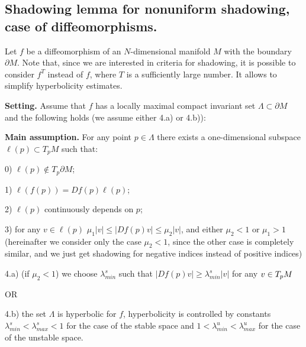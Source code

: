 \documentclass[11pt]{article}
\theoremstyle{Mystyle}
\begin{document}
\subsection{Shadowing lemma for nonuniform shadowing, case of diffeomorphisms.}

Let $f$ be a diffeomorphism of an $N$-dimensional manifold $M$ with the boundary~$\partial M$.
Note that, since we are interested in criteria for shadowing, it is possible to consider $f^{T}$ instead of $f$, where $T$ is a sufficiently large number. It allows to simplify hyperbolicity estimates.

\textbf{Setting.}  %
Assume that $f$ has a locally maximal compact invariant set $\Lambda\subset\partial M$ and the following holds (we assume either 4.a) or 4.b)):

\textbf{Main assumption.} For any point $p\in\Lambda$ there exists a one-dimensional subspace $\ell(p)\subset T_pM$ such that: 

0) $\ell(p)\notin T_{p}\partial M$;

1) $\ell(f(p)) = Df(p)\ell(p)$; 

2) $\ell(p)$ continuously depends on $p$; 

3) for any $v\in\ell(p)$ $\mu_1|v|\leq |Df(p)v|\leq\mu_2|v|$, and either $\mu_2<1$ or $\mu_1>1$ (hereinafter we consider only the case $\mu_2<1$, since the other case is completely similar, and we just get shadowing for negative indices instead of positive indices)

4.a) (if $\mu_2<1$) we choose $\lambda^s_{min}$ such that 
$|Df(p)v|\geq \lambda^{s}_{min}|v|$ for any $v\in\nobreak T_{p}M$

OR

4.b) the set $\Lambda$ is hyperbolic for $f$, hyperbolicity is controlled by constants
$\lambda^s_{min}<\lambda^s_{max}<1$ for the case of the stable space and $1<\lambda^u_{min}<\lambda^u_{max}$ for the case of the unstable space. 
\end{document}
